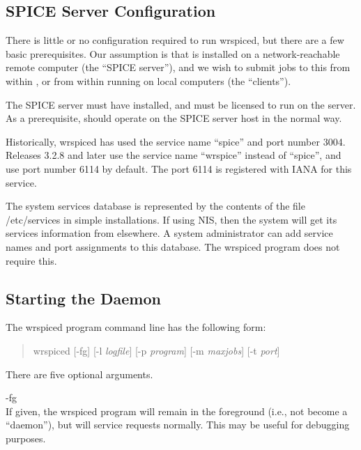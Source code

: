 {%
\subsection{SPICE Server Configuration}

There is little or no configuration required to run {\vt wrspiced},
but there are a few basic prerequisites.  Our assumption is that
{\WRspice} is installed on a network-reachable remote computer (the
``SPICE server''), and we wish to submit jobs to this {\WRspice} from
within {\Xic}, or from within {\WRspice} running on local computers
(the ``clients'').

The SPICE server must have {\WRspice} installed, and {\WRspice} must
be licensed to run on the server.
As a prerequisite, {\WRspice} should operate on the
SPICE server host in the normal way.

Historically, {\vt wrspiced} has used the service name ``{\vt spice}''
and port number 3004.  Releases 3.2.8 and later use the service name
``{\vt wrspice}'' instead of ``{\vt spice}'', and use port number 6114
by default.  The port 6114 is registered with IANA for this service.

The system services database is represented by the contents of the
file {\vt /etc/services} in simple installations.  If using NIS, then
the system will get its services information from elsewhere.  A system
administrator can add service names and port assignments to this
database.  The {\vt wrspiced} program does not require this.

\subsection{Starting the Daemon}

The {\vt wrspiced} program command line has the following form:

\begin{quote}
{\vt wrspiced} [{\vt -fg}] [{\vt -l} {\it logfile\/}]
  [{\vt -p} {\it program\/}] [{\vt -m} {\it maxjobs\/}] [{\vt -t} {\it port\/}]
\end{quote}

There are five optional arguments.
\begin{description}
\item{\vt -fg}\\
If given, the {\vt wrspiced} program will remain in the foreground
(i.e., not become a ``daemon''), but will service requests normally. 
This may be useful for debugging purposes.


\end{description}}
